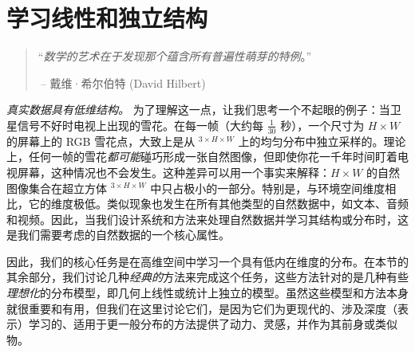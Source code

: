 \documentclass[../../book-main_zh.tex]{subfiles}
\begin{document}
\chapter{学习线性和独立结构}
\label{ch:classic}\label{ch:linear-independent}

\begin{quote}
\hfill  “{\em 数学的艺术在于发现那个蕴含所有普遍性萌芽的特例}。”


$~$\hfill -- 戴维·希尔伯特 (David Hilbert)
\end{quote}
\vspace{5mm}







\textit{真实数据具有低维结构。} 为了理解这一点，让我们思考一个不起眼的例子：当卫星信号不好时电视上出现的雪花。在每一帧（大约每 \(\frac{1}{30}\) 秒），一个尺寸为 \(H \times W\) 的屏幕上的 RGB 雪花点，大致上是从 \(^{3 \times H \times W}\) 上的均匀分布中独立采样的。理论上，任何一帧的雪花\textit{都可能}碰巧形成一张自然图像，但即使你花一千年时间盯着电视屏幕，这种情况也不会发生。这种差异可以用一个事实来解释：\(H \times W\) 的自然图像集合在超立方体 \(^{3 \times H \times W}\) 中只占极小的一部分。特别是，与环境空间维度相比，它的维度极低。类似现象也发生在所有其他类型的自然数据中，如文本、音频和视频。因此，当我们设计系统和方法来处理自然数据并学习其结构或分布时，这是我们需要考虑的自然数据的一个核心属性。%

因此，我们的核心任务是在高维空间中学习一个具有低内在维度的分布。在本节的其余部分，我们讨论几种\textit{经典的}方法来完成这个任务，这些方法针对的是几种有些\textit{理想化}的分布模型，即几何上线性或统计上独立的模型。虽然这些模型和方法本身就很重要和有用，但我们在这里讨论它们，是因为它们为更现代的、涉及深度（表示）学习的、适用于更一般分布的方法提供了动力、灵感，并作为其前身或类似物。
\end{document}
